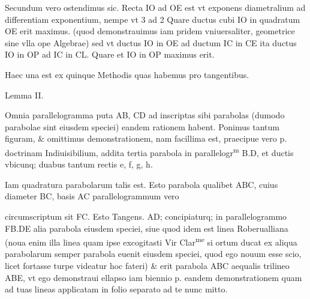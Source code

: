 \documentclass[11pt,a4paper]{article}
\begin{document}
Secundum vero ostendimus sic. Recta IO ad OE est vt exponens diametralium ad differentiam exponentium, nempe vt 3 ad 2 Quare ductus cubi IO in quadratum OE erit maximus. (quod demonstrauimus iam pridem vniuersaliter, geometrice sine vlla ope Algebrae) sed vt ductus IO in OE ad ductum IC in CE ita ductus IO in OP ad IC in CL. Quare et IO in OP maximus erit.

Haec una est ex quinque Methodis quas habemus pro tangentibus.

Lemma II.

Omnia parallelogramma puta AB, CD ad inscriptas sibi parabolas (dumodo parabolae sint eiusdem speciei) eandem rationem habent. Ponimus tantum figuram, \& omittimus demonstrationem, nam facillima est, praecipue vero p. doctrinam Indiuisibilium, addita tertia parabola in parallelogr\textsuperscript{m} B.D, et ductis vbicunq; duabus tantum rectis  e, f, g, h.

Iam quadratura parabolarum talis est. Esto parabola qualibet ABC, cuius diameter BC, basis AC parallelogrammum vero


circumscriptum sit FC. Esto Tangens. AD; concipiaturq; in parallelogrammo FB.DE alia parabola eiusdem speciei, siue quod idem est linea Roberualliana (noua enim illa linea quam ipse excogitasti Vir Clar\textsuperscript{me} si ortum ducat ex aliqua parabolarum semper parabola euenit eiusdem speciei, quod ego nouum esse scio, licet fortasse turpe videatur hoc fateri) \& erit parabola ABC aequalis trilineo ABE, vt ego demonstraui ellapso iam biennio p. eandem demonstrationem quam ad tuas lineas applicatam in folio separato ad te nunc mitto.
\end{document}
